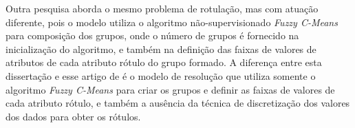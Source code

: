 Outra pesquisa \cite{Filho2015}  aborda o mesmo problema de rotulação, mas com atuação diferente, pois o modelo utiliza o algoritmo não-supervisionado \textit{Fuzzy C-Means} para composição dos grupos, onde o número de grupos é fornecido na inicialização do algoritmo, e também na definição das faixas de valores de atributos de cada atributo rótulo do grupo formado. A diferença entre esta dissertação e esse artigo de  é o modelo de resolução que utiliza somente o algoritmo \textit{Fuzzy C-Means} para criar os grupos e definir as faixas de valores de cada atributo rótulo, e também a ausência da técnica de discretização dos valores dos dados para obter os rótulos.




